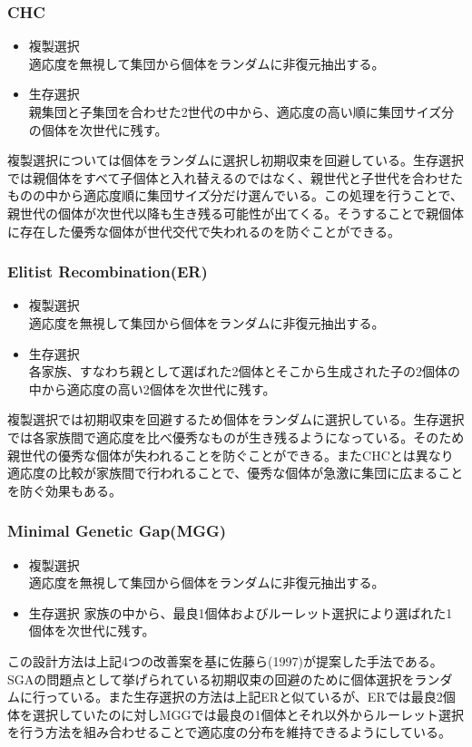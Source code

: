 \subsubsection{CHC}
\begin{itemize}
\item{複製選択}\\
適応度を無視して集団から個体をランダムに非復元抽出する。
\item{生存選択}\\
親集団と子集団を合わせた2世代の中から、適応度の高い順に集団サイズ分の個体を次世代に残す。
\end{itemize}
複製選択については個体をランダムに選択し初期収束を回避している。生存選択では親個体をすべて子個体と入れ替えるのではなく、親世代と子世代を合わせたものの中から適応度順に集団サイズ分だけ選んでいる。この処理を行うことで、親世代の個体が次世代以降も生き残る可能性が出てくる。そうすることで親個体に存在した優秀な個体が世代交代で失われるのを防ぐことができる。

\subsubsection{Elitist Recombination(ER)}
\begin{itemize}
\item{複製選択}\\
適応度を無視して集団から個体をランダムに非復元抽出する。
\item{生存選択}\\
各家族、すなわち親として選ばれた2個体とそこから生成された子の2個体の中から適応度の高い2個体を次世代に残す。
\end{itemize}
複製選択では初期収束を回避するため個体をランダムに選択している。生存選択では各家族間で適応度を比べ優秀なものが生き残るようになっている。そのため親世代の優秀な個体が失われることを防ぐことができる。またCHCとは異なり適応度の比較が家族間で行われることで、優秀な個体が急激に集団に広まることを防ぐ効果もある。

\subsubsection{Minimal Genetic Gap(MGG)}
\begin{itemize}
\item{複製選択}\\
適応度を無視して集団から個体をランダムに非復元抽出する。
\item{生存選択}
家族の中から、最良1個体およびルーレット選択により選ばれた1個体を次世代に残す。
\end{itemize}
この設計方法は上記4つの改善案を基に佐藤ら(1997)が提案した手法である。SGAの問題点として挙げられている初期収束の回避のために個体選択をランダムに行っている。また生存選択の方法は上記ERと似ているが、ERでは最良2個体を選択していたのに対しMGGでは最良の1個体とそれ以外からルーレット選択を行う方法を組み合わせることで適応度の分布を維持できるようにしている。

